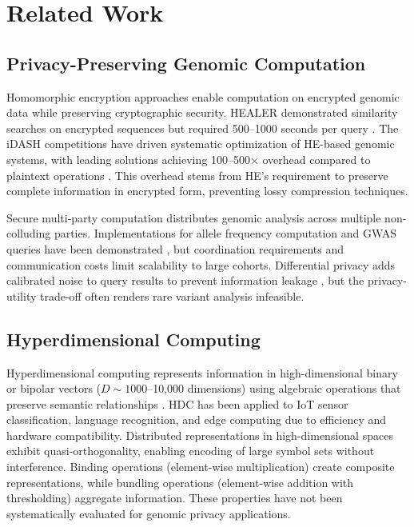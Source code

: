 \documentclass[11pt,letterpaper]{article}
\begin{document}
\section{Related Work}

\subsection{Privacy-Preserving Genomic Computation}

Homomorphic encryption approaches enable computation on encrypted genomic data while preserving cryptographic security. HEALER demonstrated similarity searches on encrypted sequences but required 500--1000 seconds per query \cite{chen2016}. The iDASH competitions have driven systematic optimization of HE-based genomic systems, with leading solutions achieving 100--500$\times$ overhead compared to plaintext operations \cite{wang2017}. This overhead stems from HE's requirement to preserve complete information in encrypted form, preventing lossy compression techniques.

Secure multi-party computation distributes genomic analysis across multiple non-colluding parties. Implementations for allele frequency computation and GWAS queries have been demonstrated \cite{kamm2013}, but coordination requirements and communication costs limit scalability to large cohorts. Differential privacy adds calibrated noise to query results to prevent information leakage \cite{simmons2016}, but the privacy-utility trade-off often renders rare variant analysis infeasible.

\subsection{Hyperdimensional Computing}

Hyperdimensional computing represents information in high-dimensional binary or bipolar vectors ($D \sim 1000$--10,000 dimensions) using algebraic operations that preserve semantic relationships \cite{karunaratne2021}. HDC has been applied to IoT sensor classification, language recognition, and edge computing due to efficiency and hardware compatibility. Distributed representations in high-dimensional spaces exhibit quasi-orthogonality, enabling encoding of large symbol sets without interference. Binding operations (element-wise multiplication) create composite representations, while bundling operations (element-wise addition with thresholding) aggregate information. These properties have not been systematically evaluated for genomic privacy applications.
\end{document}
